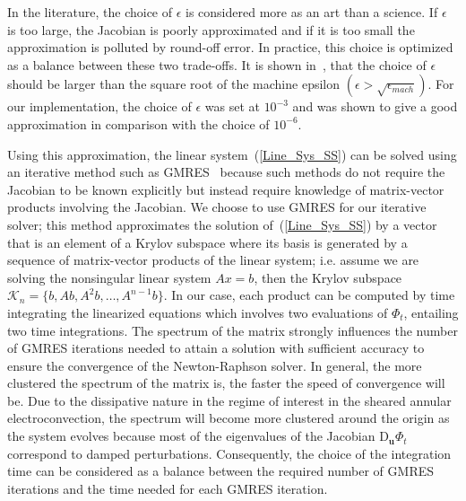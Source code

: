 In the literature, the choice of $\epsilon$ is considered more as an art than a science. If $\epsilon$ is too large, the Jacobian is poorly approximated and if it is too small the approximation is polluted by round-off error. In practice, this choice is optimized  as a balance between these two trade-offs. It is shown in~\cite{epsilon_size}, that the choice of $\epsilon$ should be larger than the square root of the machine epsilon $(\epsilon > \sqrt{\epsilon_{mach}})$. For our implementation, the choice of $\epsilon$ was set at $10^{-3}$ and was shown to give a good approximation in comparison with the choice of $10^{-6}$.

Using this approximation, the linear system~(\ref{Line_Sys_SS}) can be solved using an iterative method such as GMRES~\cite{Saad} because such methods do not require the Jacobian to be known explicitly but instead require knowledge of matrix-vector products involving the Jacobian. We choose to use GMRES for our iterative solver; this method approximates the solution of~(\ref{Line_Sys_SS}) by a vector that is an element of a Krylov subspace where its basis is generated by a sequence of matrix-vector products of the linear system; i.e. assume we are solving the nonsingular linear system $Ax=b$, then the Krylov subspace $\mathcal{K}_n = \{b,Ab,A^2b,\ldots,A^{n-1}b\}$. In our case, each product can be computed by time integrating the linearized equations which involves two evaluations of $\Phi_t$, entailing two time integrations. The spectrum of the matrix strongly influences the number of GMRES iterations needed to attain a solution with sufficient accuracy to ensure the convergence of the Newton-Raphson solver. In general, the more clustered the spectrum of the matrix is, the faster the speed of convergence will be.
Due to the dissipative nature in the regime of interest in the sheared annular electroconvection, the spectrum  will become more clustered around the origin as the system evolves because most of the eigenvalues of the Jacobian $\mathrm{D}_{\mathbf{u}}\Phi_t$ correspond to damped perturbations. Consequently, the choice of the integration time can be considered as a balance between the  required number of GMRES iterations and the time needed for each GMRES iteration.
